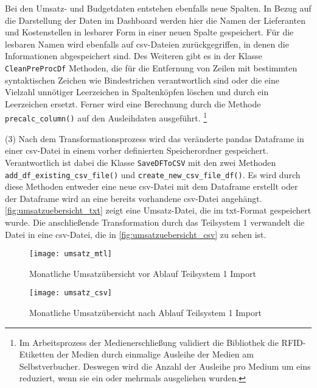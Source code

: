     
    Bei den Umsatz- und Budgetdaten entstehen ebenfalls neue Spalten. In Bezug auf die Darstellung der Daten im Dashboard werden
    hier die Namen der Lieferanten und Kostenstellen in lesbarer Form in einer neuen Spalte gespeichert. Für die lesbaren Namen wird ebenfalls auf csv-Dateien zurückgegriffen, in denen die Informationen abgespeichert sind.
    Des Weiteren gibt es in der Klasse \texttt{CleanPreProcDf} Methoden, die für die Entfernung von Zeilen mit bestimmten syntaktischen Zeichen wie Bindestrichen 
    verantwortlich sind oder die eine Vielzahl unnötiger Leerzeichen in Spaltenköpfen löschen  und durch ein Leerzeichen ersetzt.
    Ferner wird eine Berechnung durch die Methode \texttt{precalc\_column()} auf den Ausleihdaten ausgeführt.
    \footnote{ Im Arbeitsprozess der Medienerschließung validiert die Bibliothek die RFID-Etiketten der Medien durch einmalige Ausleihe der Medien am Selbstverbucher.
    Deswegen wird die Anzahl der Ausleihe pro Medium um eins reduziert, wenn sie ein oder mehrmals ausgeliehen wurden.}
     
    (3) Nach dem Transformationsprozess wird das veränderte pandas Dataframe in einer csv-Datei in einem vorher definierten Speicherordner gespeichert. 
    Verantwortlich ist dabei die Klasse \texttt{SaveDFToCSV} mit den zwei Methoden \texttt{add\_df\_existing\_csv\_file()} und 
    \texttt{create\_new\_csv\_file\_df()}. 
    Es wird durch diese Methoden entweder eine neue csv-Datei mit dem Dataframe erstellt oder der Dataframe wird an eine bereits vorhandene csv-Datei angehängt.
    \autoref{fig:umsatzuebersicht_txt} zeigt eine Umsatz-Datei, die im txt-Format gespeichert wurde. Die anschließende Transformation durch das Teilsystem 1
    verwandelt die Datei in eine csv-Datei, die in \autoref{fig:umsatzuebersicht_csv} zu sehen ist.

    \begin{figure}[H]
        \centering
            \texttt{[image: umsatz\_mtl]}
            \caption{Monatliche Umsatzübersicht vor Ablauf Teilsystem 1 Import}
            \label{fig:umsatzuebersicht_txt}
    \end{figure}


    \begin{figure}[H]
        \centering
            \texttt{[image: umsatz\_csv]}
            \caption{Monatliche Umsatzübersicht nach Ablauf Teilsystem 1 Import}
            \label{fig:umsatzuebersicht_csv}
    \end{figure}

